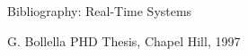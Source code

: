 \documentclass{beamer}
\begin{document}
\begin{frame}{Bibliography: Real-Time Systems}
	\begin{thebibliography}{10}
		\beamertemplatebookbibitems		
		
		G. Bollella 
		\newblock {}
		\newblock PHD Thesis, Chapel Hill, 1997	
	
	    
	   	\beamertemplatearticlebibitems
	    
%	    
\end{thebibliography}
	    
  


\end{frame}		



		
	
\end{document}
